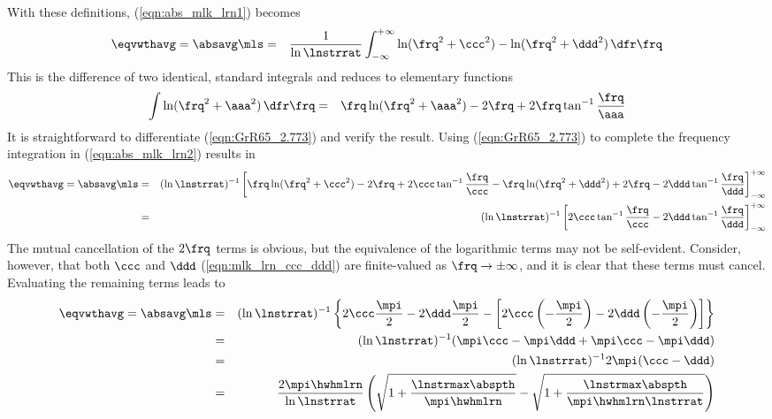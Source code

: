 \documentclass[12pt]{article}
\begin{document}
With these definitions, (\ref{eqn:abs_mlk_lrn1}) becomes
\begin{eqnarray}
\eqvwthavg = \absavg \mls 
& = & 
\frac{1}{\ln \lnstrrat}
\int_{-\infty}^{+\infty} 
\ln ( \frq^{2} + \ccc^{2} ) - \ln ( \frq^{2} + \ddd^{2} )
\,\dfr\frq 
\label{eqn:abs_mlk_lrn2}
\end{eqnarray}
This is the difference of two identical, standard integrals
\cite[e.g.,][p.~205]{GrR65} and reduces to elementary functions  
\begin{eqnarray}
\int \ln (\frq^{2} + \aaa^{2}) \,\dfr\frq & = & 
\frq \ln ( \frq^{2} + \aaa^{2} ) - 2 \frq + 2 \frq \tan^{-1} \frac{\frq}{\aaa}
\label{eqn:GrR65_2.773}
\end{eqnarray}
It is straightforward to differentiate (\ref{eqn:GrR65_2.773}) and
verify the result.
Using (\ref{eqn:GrR65_2.773}) to complete the frequency integration in
(\ref{eqn:abs_mlk_lrn2}) results in
\begin{eqnarray}
\eqvwthavg = \absavg \mls 
& = & 
(\ln \lnstrrat)^{-1} \left[ 
 \frq \ln ( \frq^{2} + \ccc^{2} ) - 2 \frq + 2 \ccc \tan^{-1} \frac{\frq}{\ccc}
-\frq \ln ( \frq^{2} + \ddd^{2} ) + 2 \frq - 2 \ddd \tan^{-1} \frac{\frq}{\ddd}
\right]_{-\infty}^{+\infty} \nonumber \\
& = & 
(\ln \lnstrrat)^{-1} \left[ 
 2 \ccc \tan^{-1} \frac{\frq}{\ccc} - 2 \ddd \tan^{-1} \frac{\frq}{\ddd}
\right]_{-\infty}^{+\infty} \nonumber
\label{eqn:abs_mlk_lrn3}
\end{eqnarray}
The mutual cancellation of the $2\frq$ terms is obvious, but the
equivalence of the logarithmic terms may not be self-evident.
Consider, however, that both $\ccc$ and $\ddd$ (\ref{eqn:mlk_lrn_ccc_ddd})
are finite-valued as $\frq \rightarrow \pm \infty$, and it is clear
that these terms must cancel. 
Evaluating the remaining terms leads to 
\begin{eqnarray}
\eqvwthavg = \absavg \mls 
& = & 
(\ln \lnstrrat)^{-1} \left\{ 
 2 \ccc \frac{\mpi}{2} - 2 \ddd \frac{\mpi}{2} - \left[
 2 \ccc \left( - \frac{\mpi}{2} \right) - 
 2 \ddd \left( - \frac{\mpi}{2} \right) \right] 
\right\} \nonumber \\
& = & 
(\ln \lnstrrat)^{-1} 
( \mpi \ccc - \mpi \ddd + \mpi \ccc - \mpi \ddd ) \nonumber \\
& = & 
(\ln \lnstrrat)^{-1} 2 \mpi ( \ccc - \ddd ) \nonumber \\
& = & 
\frac{2 \mpi \hwhmlrn}{\ln \lnstrrat} 
\left( 
\sqrt{1 + \frac{\lnstrmax \abspth}{\mpi \hwhmlrn}} -
\sqrt{1 + \frac{\lnstrmax \abspth}{\mpi \hwhmlrn \lnstrrat}}
\right)
\label{eqn:abs_mlk_lrn4}
\end{eqnarray}
\end{document}
